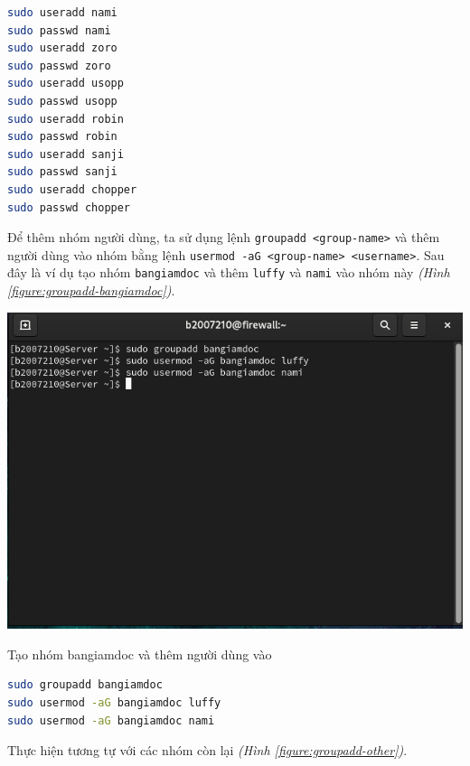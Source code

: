 \documentclass[a4paper, 11pt]{article}
\begin{document}
\begin{lstlisting}[language=bash, caption=Tạo và đặt mật khẩu cho các người dùng còn lại]
sudo useradd nami
sudo passwd nami
sudo useradd zoro
sudo passwd zoro
sudo useradd usopp
sudo passwd usopp
sudo useradd robin
sudo passwd robin
sudo useradd sanji
sudo passwd sanji
sudo useradd chopper
sudo passwd chopper
\end{lstlisting}

Để thêm nhóm người dùng, ta sử dụng lệnh \texttt{groupadd <group-name>} và thêm người dùng vào nhóm bằng lệnh \texttt{usermod -aG <group-name> <username>}.
Sau đây là ví dụ tạo nhóm \texttt{bangiamdoc} và thêm \texttt{luffy} và \texttt{nami} vào nhóm này \textit{(Hình \ref{figure:groupadd-bangiamdoc})}.

\begin{minipage}
    {\linewidth}
    \captionsetup{type=figure}
    \centering
    \includegraphics[width=\linewidth]{images/groupadd-bangiamdoc.png}
    \caption{Tạo nhóm bangiamdoc và thêm người dùng vào}
    \label{figure:groupadd-bangiamdoc}
\end{minipage}

\begin{lstlisting}[language=bash, caption=Tạo nhóm \texttt{bangiamdoc} và thêm người dùng vào]
sudo groupadd bangiamdoc
sudo usermod -aG bangiamdoc luffy
sudo usermod -aG bangiamdoc nami
\end{lstlisting}

Thực hiện tương tự với các nhóm còn lại \textit{(Hình \ref{figure:groupadd-other})}.
\end{document}
